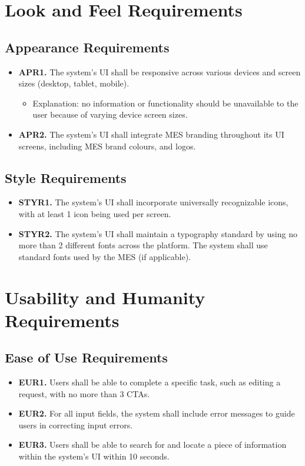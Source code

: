 \documentclass[12pt]{article}
\begin{document}
\section{Look and Feel Requirements}
\subsection{Appearance Requirements}

\begin{itemize}
    \item \textbf{APR1.} The system's UI shall be responsive across various devices and screen sizes (desktop, tablet, mobile).
    \begin{itemize}
        \item Explanation: no information or functionality should be unavailable to the user because of varying device screen sizes.
    \end{itemize}
    \item \textbf{APR2.} The system's UI shall integrate MES branding throughout its UI screens, including MES brand colours, and logos.
\end{itemize}

\subsection{Style Requirements}
\begin{itemize}
    \item \textbf{STYR1.} The system's UI shall incorporate universally recognizable icons, with at least 1 icon being used per screen.
    \item \textbf{STYR2.} The system's UI shall maintain a typography standard by using no more than 2 different fonts across the platform. The system shall use standard fonts used by the MES (if applicable).
\end{itemize}

\section{Usability and Humanity Requirements}
\subsection{Ease of Use Requirements}

\begin{itemize}
    \item \textbf{EUR1.} Users shall be able to complete a specific task, such as editing a request, with no more than 3 CTAs.
    \item \textbf{EUR2.} For all input fields, the system shall include error messages to guide users in correcting input errors.
    \item \textbf{EUR3.} Users shall be able to search for and locate a piece of information within the system's UI within 10 seconds.
\end{itemize}
\end{document}
